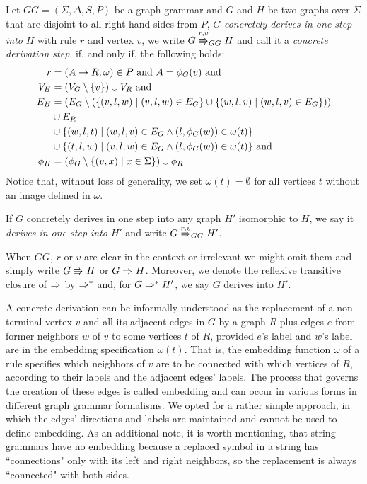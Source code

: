 \begin{definition}
	\label{def:gg_dstep}
	Let $GG = (\Sigma, \Delta, S, P)$ be a graph grammar and $G$ and $H$ be two graphs over $\Sigma$ that are disjoint to all right-hand sides from $P$, $G$ \emph{concretely derives in one step into} $H$ with rule $r$ and vertex $v$, we write $G \cderiv{r}{v}{GG} H$ and call it a \emph{concrete derivation step}, if, and only if, the following holds:
	\begin{align*}
		r & = (A \to R, \omega) \in P \text{ and } A = \phi_G(v) \text{ and} \\
		V_H  & = (V_G \setminus \{v\}) \cup V_R \text{ and} \\
		E_H & = (E_G \setminus (\{(v,l,w) \; | \; (v,l,w) \in E_G\} \cup \{(w,l,v) \; | \; (w,l,v) \in E_G\})) \\
		& \cup E_R \\
		& \cup \{(w,l,t) \; | \; (w,l,v) \in E_G \land (l,\phi_G(w)) \in \omega(t)\} \\
		& \cup \{(t,l,w) \; | \; (v,l,w) \in E_G \land (l,\phi_G(w)) \in \omega(t)\} \text{ and} \\
		\phi_H & = (\phi_G \setminus \{(v,x) \; | \; x \in \Sigma \}) \cup \phi_R
	\end{align*}
	Notice that, without loss of generality, we set $\omega(t) = \emptyset$ for all vertices $t$ without an image defined in $\omega$.
	
	If $G$ concretely derives in one step into any graph $H'$ isomorphic to $H$, we say it \emph{derives in one step into} $H'$ and write $G \deriv{r}{v}{GG} H'$. 
	
	When $GG$, $r$ or $v$ are clear in the context or irrelevant we might omit them and simply write $G \cderiv{}{}{} H$ or $G \deriv{}{}{} H$. Moreover, we denote the reflexive transitive closure of $\deriv{}{}{}$ by $\Rightarrow^*_{}$ and, for $G \Rightarrow^*_{} H'$, we say $G$ derives into $H'$.
\end{definition}

A concrete derivation can be informally understood as the replacement of a non-terminal vertex $v$ and all its adjacent edges in $G$ by a graph $R$ plus edges $e$ from former neighbors $w$ of $v$ to some vertices $t$ of $R$, provided $e$'s label and $w$'s label are in the embedding specification $\omega(t)$. That is, the embedding function $\omega$ of a rule specifies which neighbors of $v$ are to be connected with which vertices of $R$, according to their labels and the adjacent edges' labels. The process that governs the creation of these edges is called embedding and can occur in various forms in different graph grammar formalisms. We opted for a rather simple approach, in which the edges' directions and labels are maintained and cannot be used to define embedding. As an additional note, it is worth mentioning, that string grammars have no embedding because a replaced symbol in a string has ``connections" only with its left and right neighbors, so the replacement is always ``connected" with both sides.

